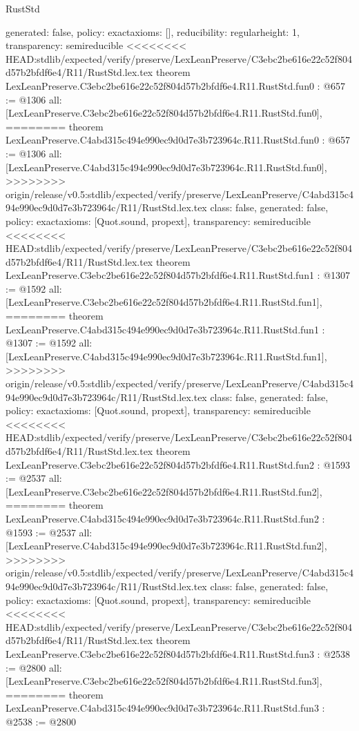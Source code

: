 \begin{lexlean}{RustStd}
\begin{coremodule}
{\begin{coremodule}
{{{  generated: false,
  policy: exact{axioms: []},
  reducibility: regular{height: 1},
  transparency: semireducible
}
<<<<<<<< HEAD:stdlib/expected/verify/preserve/LexLeanPreserve/C3ebc2be616e22c52f804d57b2bfdf6e4/R11/RustStd.lex.tex
theorem LexLeanPreserve.C3ebc2be616e22c52f804d57b2bfdf6e4.R11.RustStd.fun0 : @657 := @1306 {
  all: [LexLeanPreserve.C3ebc2be616e22c52f804d57b2bfdf6e4.R11.RustStd.fun0],
========
theorem LexLeanPreserve.C4abd315c494e990ec9d0d7e3b723964c.R11.RustStd.fun0 : @657 := @1306 {
  all: [LexLeanPreserve.C4abd315c494e990ec9d0d7e3b723964c.R11.RustStd.fun0],
>>>>>>>> origin/release/v0.5:stdlib/expected/verify/preserve/LexLeanPreserve/C4abd315c494e990ec9d0d7e3b723964c/R11/RustStd.lex.tex
  class: false,
  generated: false,
  policy: exact{axioms: [Quot.sound, propext]},
  transparency: semireducible
}
<<<<<<<< HEAD:stdlib/expected/verify/preserve/LexLeanPreserve/C3ebc2be616e22c52f804d57b2bfdf6e4/R11/RustStd.lex.tex
theorem LexLeanPreserve.C3ebc2be616e22c52f804d57b2bfdf6e4.R11.RustStd.fun1 : @1307 := @1592 {
  all: [LexLeanPreserve.C3ebc2be616e22c52f804d57b2bfdf6e4.R11.RustStd.fun1],
========
theorem LexLeanPreserve.C4abd315c494e990ec9d0d7e3b723964c.R11.RustStd.fun1 : @1307 := @1592 {
  all: [LexLeanPreserve.C4abd315c494e990ec9d0d7e3b723964c.R11.RustStd.fun1],
>>>>>>>> origin/release/v0.5:stdlib/expected/verify/preserve/LexLeanPreserve/C4abd315c494e990ec9d0d7e3b723964c/R11/RustStd.lex.tex
  class: false,
  generated: false,
  policy: exact{axioms: [Quot.sound, propext]},
  transparency: semireducible
}
<<<<<<<< HEAD:stdlib/expected/verify/preserve/LexLeanPreserve/C3ebc2be616e22c52f804d57b2bfdf6e4/R11/RustStd.lex.tex
theorem LexLeanPreserve.C3ebc2be616e22c52f804d57b2bfdf6e4.R11.RustStd.fun2 : @1593 := @2537 {
  all: [LexLeanPreserve.C3ebc2be616e22c52f804d57b2bfdf6e4.R11.RustStd.fun2],
========
theorem LexLeanPreserve.C4abd315c494e990ec9d0d7e3b723964c.R11.RustStd.fun2 : @1593 := @2537 {
  all: [LexLeanPreserve.C4abd315c494e990ec9d0d7e3b723964c.R11.RustStd.fun2],
>>>>>>>> origin/release/v0.5:stdlib/expected/verify/preserve/LexLeanPreserve/C4abd315c494e990ec9d0d7e3b723964c/R11/RustStd.lex.tex
  class: false,
  generated: false,
  policy: exact{axioms: [Quot.sound, propext]},
  transparency: semireducible
}
<<<<<<<< HEAD:stdlib/expected/verify/preserve/LexLeanPreserve/C3ebc2be616e22c52f804d57b2bfdf6e4/R11/RustStd.lex.tex
theorem LexLeanPreserve.C3ebc2be616e22c52f804d57b2bfdf6e4.R11.RustStd.fun3 : @2538 := @2800 {
  all: [LexLeanPreserve.C3ebc2be616e22c52f804d57b2bfdf6e4.R11.RustStd.fun3],
========
theorem LexLeanPreserve.C4abd315c494e990ec9d0d7e3b723964c.R11.RustStd.fun3 : @2538 := @2800 {
}}}}}}}
\end{coremodule}}
\end{coremodule}
\end{lexlean}
